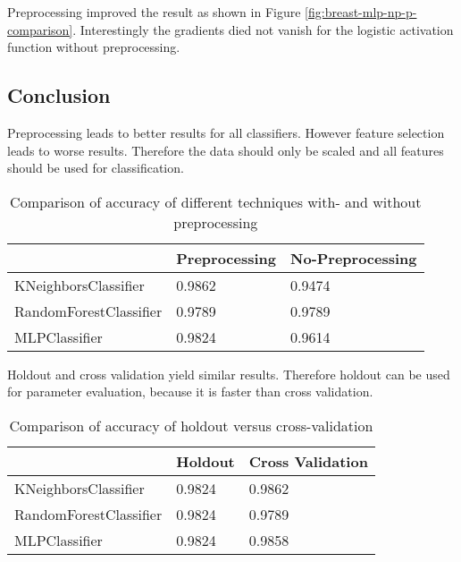 Preprocessing improved the result as shown in Figure \ref{fig:breast-mlp-np-p-comparison}.
Interestingly the gradients died not vanish for the logistic activation function without preprocessing.


\subsection{Conclusion}

Preprocessing leads to better results for all classifiers.
However feature selection leads to worse results.
Therefore the data should only be scaled and all features should be used for classification.

\begin{table}[H]
\begin{center}
\begin{tabular}{|l|l|l|}
\hline
                       & Preprocessing & No-Preprocessing \\ \hline
KNeighborsClassifier   & 0.9862        & 0.9474           \\ \hline
RandomForestClassifier & 0.9789        & 0.9789           \\ \hline
MLPClassifier          & 0.9824        & 0.9614           \\ \hline
\end{tabular}
\caption{Comparison of accuracy of different techniques with- and without preprocessing}
\end{center}
\end{table}

Holdout and cross validation yield similar results.
Therefore holdout can be used for parameter evaluation, because it is faster than cross validation.

\begin{table}[H]
\begin{center}
\begin{tabular}{|l|l|l|}
\hline
                       & Holdout & Cross Validation \\ \hline
KNeighborsClassifier   & 0.9824  & 0.9862           \\ \hline
RandomForestClassifier & 0.9824  & 0.9789           \\ \hline
MLPClassifier          & 0.9824  & 0.9858           \\ \hline
\end{tabular}
\caption{Comparison of accuracy of holdout versus cross-validation}
\end{center}
\end{table}

